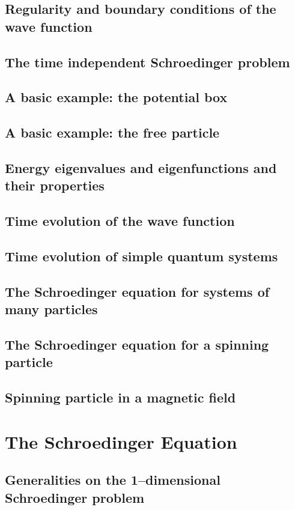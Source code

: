 \documentclass{article}
\begin{document}
\subsection{Regularity and boundary conditions of the wave function}
\subsection{The time independent Schroedinger problem}
\subsection{A basic example: the potential box}
\subsection{A basic example: the free particle}
\subsection{Energy eigenvalues and eigenfunctions and their properties}
\subsection{Time evolution of the wave function}
\subsection{Time evolution of simple quantum systems}
\subsection{The Schroedinger equation for systems of many particles}
\subsection{The Schroedinger equation for a spinning particle}
\subsection{Spinning particle in a magnetic field}

\section{The Schroedinger Equation}
\subsection{Generalities on the 1–dimensional Schroedinger problem}
\end{document}
